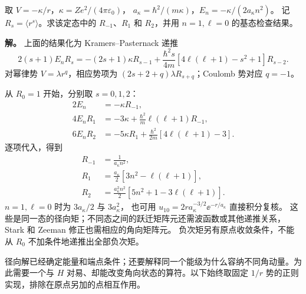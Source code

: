 \begin{example}[氢样原子的前三个径向矩]
取 $V=-\kappa/r$，$\kappa=Ze^2/(4\pi\varepsilon_0)$，
$a_\kappa=\hbar^2/(m\kappa)$，$E_n=-\kappa/(2a_\kappa n^2)$。
记 $R_s=\langle r^s\rangle$。求该定态中的 $R_{-1}$、$R_1$ 和 $R_2$，并用 $n=1,\ell=0$ 的基态检查结果。

\textbf{解。} 上面的结果化为 Kramers--Pasternack 递推
\[
2(s+1)E_nR_s
=-(2s+1)\kappa R_{s-1}
+\frac{\hbar^2s}{4m}[4\ell(\ell+1)-s^2+1]R_{s-2}.
\]
对幂律势 $V=\lambda r^q$，相应势项为
$(2s+2+q)\lambda R_{s+q}$；Coulomb 势对应 $q=-1$。

从 $R_0=1$ 开始，分别取 $s=0,1,2$：
\begin{align*}
2E_n&=-\kappa R_{-1},\\
4E_nR_1&=-3\kappa+\frac{\hbar^2}{m}\ell(\ell+1)R_{-1},\\
6E_nR_2&=-5\kappa R_1
+\frac{\hbar^2}{2m}[4\ell(\ell+1)-3].
\end{align*}
逐项代入，得到
\begin{align*}
R_{-1}&=\frac1{a_\kappa n^2},\\
R_1&=\frac{a_\kappa}{2}[3n^2-\ell(\ell+1)],\\
R_2&=\frac{a_\kappa^2n^2}{2}[5n^2+1-3\ell(\ell+1)].
\end{align*}
$n=1,\ell=0$ 时为 $3a_\kappa/2$ 与 $3a_\kappa^2$，
也可用 $u_{10}=2r a_\kappa^{-3/2}\ee^{-r/a_\kappa}$ 直接积分复核。
这些是同一态的径向矩；不同态之间的跃迁矩阵元还需波函数或其他递推关系，
Stark 和 Zeeman 修正也需相应的角向矩阵元。
负次矩另有原点收敛条件，不能从 $R_0$ 不加条件地递推出全部负次矩。
\end{example}

径向解已经确定能量和端点条件；还要解释同一个能级为什么容纳不同角动量。为此需要一个与 $H$ 对易、却能改变角向状态的算符。以下始终取固定 $1/r$ 势的正则实现，排除在原点另加的点相互作用。

